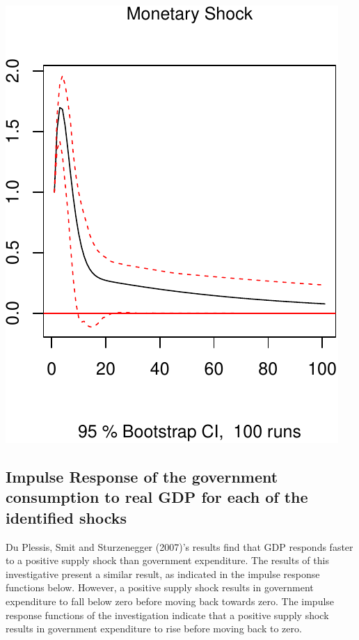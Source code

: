 \documentclass[11pt,preprint, authoryear]{elsarticle}
\numberwithin{equation}{section}
\numberwithin{figure}{section}
\numberwithin{table}{section}
\begin{document}
\includegraphics{TS_proj_files/figure-latex/unnamed-chunk-19-3.pdf}

\newpage

\hypertarget{impulse-response-of-the-government-consumption-to-real-gdp-for-each-of-the-identified-shocks}{%
\subsection{Impulse Response of the government consumption to real GDP
for each of the identified
shocks}\label{impulse-response-of-the-government-consumption-to-real-gdp-for-each-of-the-identified-shocks}}

Du Plessis, Smit and Sturzenegger (2007)'s results find that GDP
responds faster to a positive supply shock than government expenditure.
The results of this investigative present a similar result, as indicated
in the impulse response functions below. However, a positive supply
shock results in government expenditure to fall below zero before moving
back towards zero. The impulse response functions of the investigation
indicate that a positive supply shock results in government expenditure
to rise before moving back to zero.
\end{document}
